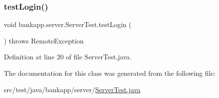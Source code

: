 \mbox{\label{classbankapp_1_1server_1_1_server_test_a810f794baa2275cad3d67c34362b0358}} 
\subsubsection{\texorpdfstring{test\+Login()}{testLogin()}}
{\footnotesize\ttfamily void bankapp.\+server.\+Server\+Test.\+test\+Login (\begin{DoxyParamCaption}{ }\end{DoxyParamCaption}) throws Remote\+Exception}



Definition at line 20 of file Server\+Test.\+java.



The documentation for this class was generated from the following file\+:\begin{DoxyCompactItemize}
\item 
src/test/java/bankapp/server/\hyperlink{_server_test_8java}{Server\+Test.\+java}\end{DoxyCompactItemize}

